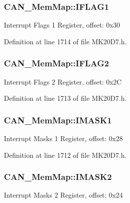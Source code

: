 \subsubsection[{\texorpdfstring{I\+F\+L\+A\+G1}{IFLAG1}}]{ C\+A\+N\+\_\+\+Mem\+Map\+::\+I\+F\+L\+A\+G1}\hypertarget{struct_c_a_n___mem_map_a9a4fc7f05bf39e47ce0bd8842a49ce2f}{}\label{struct_c_a_n___mem_map_a9a4fc7f05bf39e47ce0bd8842a49ce2f}
Interrupt Flags 1 Register, offset\+: 0x30 

Definition at line 1714 of file M\+K20\+D7.\+h.

\subsubsection[{\texorpdfstring{I\+F\+L\+A\+G2}{IFLAG2}}]{ C\+A\+N\+\_\+\+Mem\+Map\+::\+I\+F\+L\+A\+G2}\hypertarget{struct_c_a_n___mem_map_aa06064731318366c51bc3ee552491070}{}\label{struct_c_a_n___mem_map_aa06064731318366c51bc3ee552491070}
Interrupt Flags 2 Register, offset\+: 0x2C 

Definition at line 1713 of file M\+K20\+D7.\+h.

\subsubsection[{\texorpdfstring{I\+M\+A\+S\+K1}{IMASK1}}]{ C\+A\+N\+\_\+\+Mem\+Map\+::\+I\+M\+A\+S\+K1}\hypertarget{struct_c_a_n___mem_map_ad847310f75c51368595da91e905ad1bf}{}\label{struct_c_a_n___mem_map_ad847310f75c51368595da91e905ad1bf}
Interrupt Masks 1 Register, offset\+: 0x28 

Definition at line 1712 of file M\+K20\+D7.\+h.

\subsubsection[{\texorpdfstring{I\+M\+A\+S\+K2}{IMASK2}}]{ C\+A\+N\+\_\+\+Mem\+Map\+::\+I\+M\+A\+S\+K2}\hypertarget{struct_c_a_n___mem_map_a7f5ec3c75c69675f968a5d42c86d73f6}{}\label{struct_c_a_n___mem_map_a7f5ec3c75c69675f968a5d42c86d73f6}
Interrupt Masks 2 Register, offset\+: 0x24 

